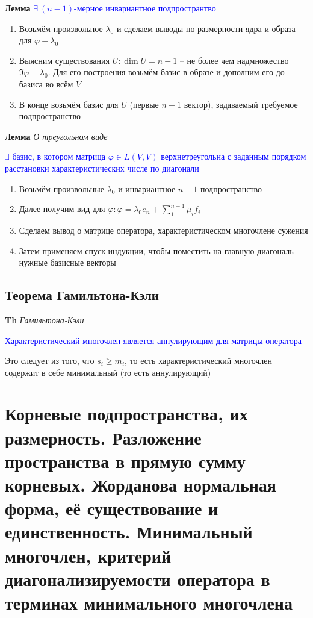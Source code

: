 \documentclass[a4paper, 14pt]{article}
\begin{document}
    \textbf{Лемма} \textcolor{blue}{$\exists~(n-1)$-мерное инвариантное подпространтво}

    \begin{enumerate}
        \item Возьмём произвольное $\lambda_0$ и сделаем выводы по размерности ядра и образа для $\varphi - \lambda_0$
        \item Выясним существования $U: \dim U = n - 1$ -- не более чем надмножество $\Im \varphi - \lambda_0$.
        Для его построения возьмём базис в образе и дополним его до базиса во всём $V$
        \item В конце возьмём базис для $U$ (первые $n-1$ вектор), задаваемый требуемое подпространство
    \end{enumerate}

    \textbf{Лемма} \textit{О треугольном виде}

    \textcolor{blue}{$\exists$ базис, в котором матрица $\varphi \in L(V, V)$ верхнетреугольна с
    заданным порядком расстановки характеристических числе по диагонали}

    \begin{enumerate}
        \item Возьмём произвольные $\lambda_0$ и инвариантное $n - 1$ подпространство
        \item Далее получим вид для $\varphi: \varphi = \lambda_0 e_n + \sum_1^{n-1} \mu_i f_i$
        \item Сделаем вывод о матрице оператора, характеристическом многочлене сужения
        \item Затем применяем спуск индукции, чтобы поместить на главную диагональ нужные базисные векторы
    \end{enumerate}

    \subsection{Теорема Гамильтона-Кэли}

    \textbf{Th} \textit{Гамильтона-Кэли}

    \textcolor{blue}{Характеристический многочлен является аннулирующим для матрицы оператора}

    Это следует из того, что $s_i \geq m_i$, то есть характеристический многочлен содержит в себе минимальный (то
    есть аннулирующий)

    \section{Корневые подпространства, их размерность.
    Разложение пространства в прямую сумму корневых.
    Жорданова нормальная форма, её существование и единственность.
    Минимальный многочлен, критерий диагонализируемости оператора в терминах минимального многочлена}
\end{document}

